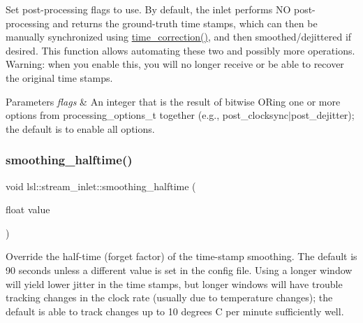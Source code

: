 Set post-\/processing flags to use. By default, the inlet performs NO post-\/processing and returns the ground-\/truth time stamps, which can then be manually synchronized using \hyperlink{classlsl_1_1stream__inlet_a845d95f5fc60fb9cd01fb73d3da75e94}{time\+\_\+correction()}, and then smoothed/dejittered if desired. This function allows automating these two and possibly more operations. Warning\+: when you enable this, you will no longer receive or be able to recover the original time stamps. 
\begin{DoxyParams}{Parameters}
{\em flags} & An integer that is the result of bitwise OR\textquotesingle{}ing one or more options from processing\+\_\+options\+\_\+t together (e.\+g., post\+\_\+clocksync$\vert$post\+\_\+dejitter); the default is to enable all options. \\
\hline
\end{DoxyParams}
\mbox{\label{classlsl_1_1stream__inlet_a2774c1dbcf3fc7b17505e8814921d17c}} 
\subsubsection{\texorpdfstring{smoothing\+\_\+halftime()}{smoothing\_halftime()}}
{\footnotesize\ttfamily void lsl\+::stream\+\_\+inlet\+::smoothing\+\_\+halftime (\begin{DoxyParamCaption}\item[{float}]{value }\end{DoxyParamCaption})\hspace{0.3cm}{\ttfamily [inline]}}

Override the half-\/time (forget factor) of the time-\/stamp smoothing. The default is 90 seconds unless a different value is set in the config file. Using a longer window will yield lower jitter in the time stamps, but longer windows will have trouble tracking changes in the clock rate (usually due to temperature changes); the default is able to track changes up to 10 degrees C per minute sufficiently well. \mbox{\label{classlsl_1_1stream__inlet_a845d95f5fc60fb9cd01fb73d3da75e94}} 
